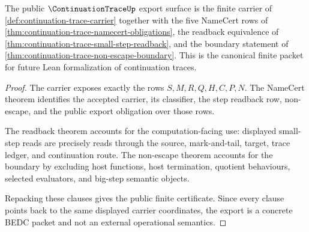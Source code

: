\begin{theorem}
\label{thm:continuation-trace-public-export}
The public $\ContinuationTraceUp$ export surface is the finite carrier of \autoref{def:continuation-trace-carrier} together with the five NameCert rows of \autoref{thm:continuation-trace-namecert-obligations}, the readback equivalence of \autoref{thm:continuation-trace-small-step-readback}, and the boundary statement of \autoref{thm:continuation-trace-non-escape-boundary}. This is the canonical finite packet for future Lean formalization of continuation traces.
\end{theorem}
\begin{proof}
The carrier exposes exactly the rows $S,M,R,Q,H,C,P,N$. The NameCert theorem identifies the accepted carrier, its classifier, the step readback row, non-escape, and the public export obligation over those rows.

The readback theorem accounts for the computation-facing use: displayed small-step reads are precisely reads through the source, mark-and-tail, target, trace ledger, and continuation route. The non-escape theorem accounts for the boundary by excluding host functions, host termination, quotient behaviours, selected evaluators, and big-step semantic objects.

Repacking these clauses gives the public finite certificate. Since every clause points back to the same displayed carrier coordinates, the export is a concrete BEDC packet and not an external operational semantics.
\end{proof}

